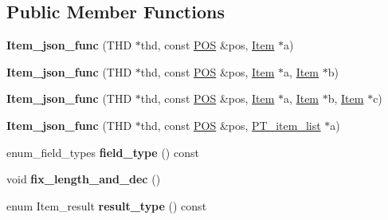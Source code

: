 \subsection*{Public Member Functions}
\begin{DoxyCompactItemize}
\item 
\mbox{\label{classItem__json__func_ab76eba833916b9c2eb7d66d2a498a7ee}} 
{\bfseries Item\+\_\+json\+\_\+func} (T\+HD $\ast$thd, const \mbox{\hyperlink{structYYLTYPE}{P\+OS}} \&pos, \mbox{\hyperlink{classItem}{Item}} $\ast$a)
\item 
\mbox{\label{classItem__json__func_a775e1e382736d43f414d3cdc38870cef}} 
{\bfseries Item\+\_\+json\+\_\+func} (T\+HD $\ast$thd, const \mbox{\hyperlink{structYYLTYPE}{P\+OS}} \&pos, \mbox{\hyperlink{classItem}{Item}} $\ast$a, \mbox{\hyperlink{classItem}{Item}} $\ast$b)
\item 
\mbox{\label{classItem__json__func_a6302512b504b1f7cda1ff5e7f188c3eb}} 
{\bfseries Item\+\_\+json\+\_\+func} (T\+HD $\ast$thd, const \mbox{\hyperlink{structYYLTYPE}{P\+OS}} \&pos, \mbox{\hyperlink{classItem}{Item}} $\ast$a, \mbox{\hyperlink{classItem}{Item}} $\ast$b, \mbox{\hyperlink{classItem}{Item}} $\ast$c)
\item 
\mbox{\label{classItem__json__func_a408a13f03d70c62fa8828991b78a8ac9}} 
{\bfseries Item\+\_\+json\+\_\+func} (T\+HD $\ast$thd, const \mbox{\hyperlink{structYYLTYPE}{P\+OS}} \&pos, \mbox{\hyperlink{classPT__item__list}{P\+T\+\_\+item\+\_\+list}} $\ast$a)
\item 
\mbox{\label{classItem__json__func_a375faa6994c6cf000ff3f8d09489aea5}} 
enum\+\_\+field\+\_\+types {\bfseries field\+\_\+type} () const
\item 
\mbox{\label{classItem__json__func_a4057722cbb753141d9e1f139d47675e4}} 
void {\bfseries fix\+\_\+length\+\_\+and\+\_\+dec} ()
\item 
\mbox{\label{classItem__json__func_aa3d3b7590e489ec0dfd4b350ba724e44}} 
enum Item\+\_\+result {\bfseries result\+\_\+type} () const
\item 
\mbox{\label{classItem__json__func_ae48909562e3e22cc9487efaf45944771}} 

\end{DoxyCompactItemize}
